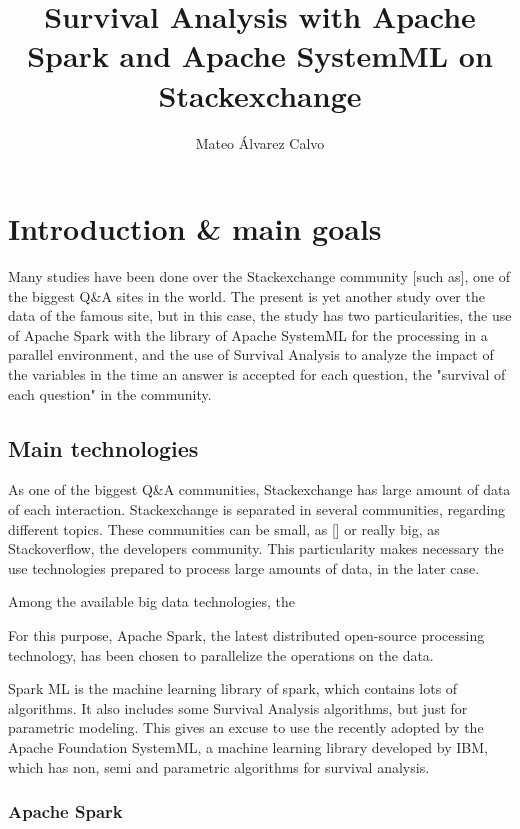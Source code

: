 \documentclass[11pt]{article} %
\title{Survival Analysis with Apache Spark and Apache SystemML on Stackexchange}
\author{Mateo Álvarez Calvo}
\begin{document}
\maketitle

\newpage
\tableofcontents
\newpage

\section{Introduction \& main goals}

Many studies have been done over the Stackexchange community [such as], one of the biggest Q\&A sites in the world. The present is yet another study over the data of the famous site, but in this case, the study has two particularities, the use of Apache Spark with the library of Apache SystemML for the processing in a parallel environment, and the use of Survival Analysis to analyze the impact of the variables in the time an answer is accepted for each question, the "survival of each question" in the community.


\subsection{Main technologies}

As one of the biggest Q\&A communities, Stackexchange has large amount of data of each interaction.
Stackexchange is separated in several communities, regarding different topics. These communities can be small, as [] or really big, as Stackoverflow, the developers community. This particularity makes necessary the use technologies prepared to process large amounts of data, in the later case.

Among the available big data technologies, the

For this purpose, Apache Spark, the latest distributed open-source processing technology, has been chosen to parallelize the operations on the data.

Spark ML is the machine learning library of spark, which contains lots of algorithms. It also includes some Survival Analysis algorithms, but just for parametric modeling. This gives an excuse to use the recently adopted by the Apache Foundation SystemML, a machine learning library developed by IBM, which has non, semi and parametric algorithms for survival analysis.


\subsubsection{Apache Spark}
\end{document}
